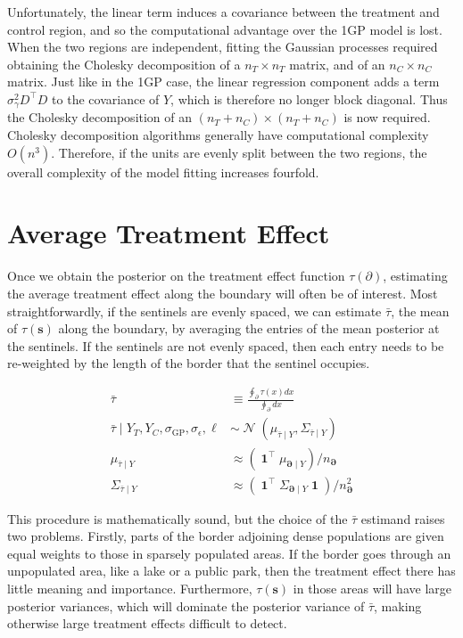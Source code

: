 \documentclass[letter]{article}
\newcommand{\genericdel}[3]{%
      \left#1#3\right#2
    }
\newcommand{\del}[1]{\genericdel(){#1}}
\DeclareMathOperator{\normal}{\mathcal{N}}
\DeclareMathOperator{\ones}{\mathbf{1}}
\newcommand{\trans}{^{\intercal}}
\newcommand{\sigmaf}{\sigma_{\mathrm{GP}}}
\newcommand{\sigman}{\sigma_{\epsilon}}
\newcommand{\sigmagamma}{\sigma_{\gamma}}
\newcommand{\svec}{\mathbold{s}}
\newcommand{\boundary}{\partial}
\newcommand{\sentinels}{\bm{\boundary}}
\newcommand{\linavg}{\bar{\tau}}
\begin{document}
Unfortunately, the linear term induces a covariance between the
treatment and control region, and so the computational advantage over
the 1GP model is lost. When the two regions are independent, fitting the
Gaussian processes required obtaining the Cholesky decomposition of a
\(n_T \times n_T\) matrix, and of an \(n_C \times n_C\) matrix. Just
like in the 1GP case, the linear regression component adds a term
\(\sigmagamma^2 D\trans D\) to the covariance of \(Y\), which is
therefore no longer block diagonal. Thus the Cholesky decomposition of
an \((n_T+n_C) \times (n_T+n_C)\) is now required. Cholesky
decomposition algorithms generally have computational complexity
\(O(n^3)\). Therefore, if the units are evenly split between the two
regions, the overall complexity of the model fitting increases fourfold.
    


    	\section{Average Treatment Effect}\label{average-treatment-effect}

Once we obtain the posterior on the treatment effect function
\(\tau(\boundary)\), estimating the average treatment effect along the
boundary will often be of interest. Most straightforwardly, if the
sentinels are evenly spaced, we can estimate \(\linavg\), the mean of
\(\tau(\svec)\) along the boundary, by averaging the entries of the mean
posterior at the sentinels. If the sentinels are not evenly spaced, then
each entry needs to be re-weighted by the length of the border that the
sentinel occupies.

\begin{equation}\begin{split}
    \linavg &\equiv \frac{\oint_\boundary \left. \tau(x) dx \right.}{\oint_\boundary \left. dx \right.} \\
    \linavg \mid Y_T, Y_C, \sigmaf, \sigman, \ell &\sim \normal\del{\mu_{\linavg \mid Y}, \Sigma_{\linavg \mid Y}} \\
    \mu_{\linavg \mid Y} &\approx \del{\ones\trans \mu_{\sentinels \mid Y}} / n_{\sentinels} \\
    \Sigma_{\linavg \mid Y} &\approx \del{\ones\trans \Sigma_{\sentinels \mid Y} \ones} / n_{\sentinels}^2
\end{split}\end{equation}

This procedure is mathematically sound, but the choice of the
\(\linavg\) estimand raises two problems. Firstly, parts of the border
adjoining dense populations are given equal weights to those in sparsely
populated areas. If the border goes through an unpopulated area, like a
lake or a public park, then the treatment effect there has little
meaning and importance. Furthermore, \(\tau(\svec)\) in those areas will
have large posterior variances, which will dominate the posterior
variance of \(\linavg\), making otherwise large treatment effects
difficult to detect.
\end{document}
